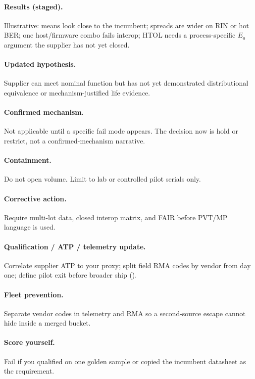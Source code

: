 \paragraph{Results (staged).}
Illustrative: means look close to the incumbent; spreads are wider on RIN or
hot BER; one host/firmware combo fails interop; HTOL needs a process-specific
$E_a$ argument the supplier has not yet closed.

\paragraph{Updated hypothesis.}
Supplier can meet nominal function but has not yet demonstrated distributional
equivalence or mechanism-justified life evidence.

\paragraph{Confirmed mechanism.}
Not applicable until a specific fail mode appears. The decision now is hold or
restrict, not a confirmed-mechanism narrative.

\paragraph{Containment.}
Do not open volume. Limit to lab or controlled pilot serials only.

\paragraph{Corrective action.}
Require multi-lot data, closed interop matrix, and FAIR before PVT/MP language
is used.

\paragraph{Qualification / ATP / telemetry update.}
Correlate supplier ATP to your proxy; split field RMA codes by vendor from day
one; define pilot exit before broader ship ().

\paragraph{Fleet prevention.}
Separate vendor codes in telemetry and RMA so a second-source escape cannot
hide inside a merged bucket.

\paragraph{Score yourself.}
Fail if you qualified on one golden sample or copied the incumbent datasheet as
the requirement.

